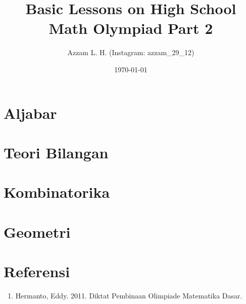 \title{Basic Lessons on High School Math Olympiad Part 2}
\date{\today}
\author{Azzam L. H. (Instagram: azzam\_29\_12)}
\maketitle
\renewcommand*\contentsname{Daftar Isi}
\tableofcontents
\newpage

\section{Aljabar}







\section{Teori Bilangan}









\section{Kombinatorika}









\section{Geometri}








\section{Referensi}
\begin{enumerate}
\item Hermanto, Eddy. 2011. Diktat Pembinaan Olimpiade Matematika Dasar.
\end{enumerate}


